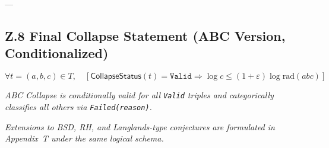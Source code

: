 \documentclass[11pt]{article}
\begin{document}
---

\subsection*{Z.8 Final Collapse Statement (ABC Version, Conditionalized)}

\[
\forall t = (a,b,c) \in T,\quad
\left[
  \mathsf{CollapseStatus}(t) = \texttt{Valid}
  \Rightarrow
  \log c \leq (1+\varepsilon)\log \mathrm{rad}(abc)
\right]
\]

\begin{center}
\textit{ABC Collapse is conditionally valid for all \texttt{Valid} triples and categorically classifies all others via \texttt{Failed(reason)}.}
\end{center}

\begin{center}
\textit{Extensions to BSD, RH, and Langlands-type conjectures are formulated in Appendix~T under the same logical schema.}
\end{center}
\end{document}

